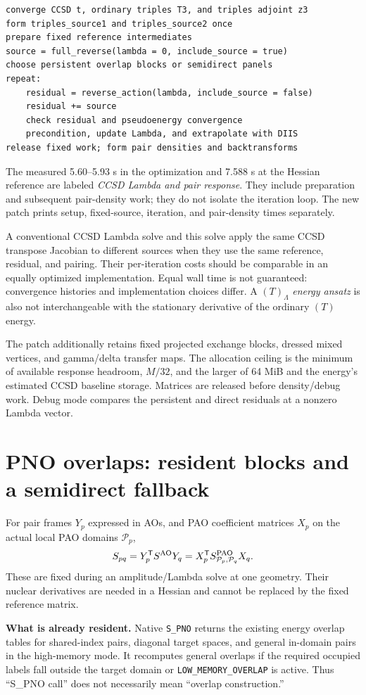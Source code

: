 \documentclass[10pt,letterpaper]{article}
\newcommand{\T}{^{\mathsf T}}
\newcommand{\sectionpage}[1]{\newpage\section{#1}}
\begin{document}
\begin{lstlisting}
converge CCSD t, ordinary triples T3, and triples adjoint z3
form triples_source1 and triples_source2 once
prepare fixed reference intermediates
source = full_reverse(lambda = 0, include_source = true)
choose persistent overlap blocks or semidirect panels
repeat:
    residual = reverse_action(lambda, include_source = false)
    residual += source
    check residual and pseudoenergy convergence
    precondition, update Lambda, and extrapolate with DIIS
release fixed work; form pair densities and backtransforms
\end{lstlisting}

The measured 5.60--5.93 s in the optimization and 7.588 s at the Hessian reference are labeled \emph{CCSD Lambda and pair response}. They include preparation and subsequent pair-density work; they do not isolate the iteration loop. The new patch prints setup, fixed-source, iteration, and pair-density times separately.

A conventional CCSD Lambda solve and this solve apply the same CCSD transpose Jacobian to different sources when they use the same reference, residual, and pairing. Their per-iteration costs should be comparable in an equally optimized implementation. Equal wall time is not guaranteed: convergence histories and implementation choices differ. A $(T)_\Lambda$ \emph{energy ansatz} is also not interchangeable with the stationary derivative of the ordinary $(T)$ energy.

The patch additionally retains fixed projected exchange blocks, dressed mixed vertices, and gamma/delta transfer maps. The allocation ceiling is the minimum of available response headroom, $M/32$, and the larger of 64 MiB and the energy's estimated CCSD baseline storage. Matrices are released before density/debug work. Debug mode compares the persistent and direct residuals at a nonzero Lambda vector.

\sectionpage{PNO overlaps: resident blocks and a semidirect fallback}
For pair frames $Y_p$ expressed in AOs, and PAO coefficient matrices $X_p$ on the actual local PAO domains $\mathcal P_p$,
\begin{equation}
S_{pq}=Y_p\T S^{\rm AO}Y_q
      =X_p\T S^{\rm PAO}_{\mathcal P_p,\mathcal P_q}X_q.
\end{equation}
These are fixed during an amplitude/Lambda solve at one geometry. Their nuclear derivatives are needed in a Hessian and cannot be replaced by the fixed reference matrix.

\textbf{What is already resident.} Native \texttt{S\_PNO} returns the existing energy overlap tables for shared-index pairs, diagonal target spaces, and general in-domain pairs in the high-memory mode. It recomputes general overlaps if the required occupied labels fall outside the target domain or \texttt{LOW\_MEMORY\_OVERLAP} is active. Thus ``S\_PNO call'' does not necessarily mean ``overlap construction.''
\end{document}

